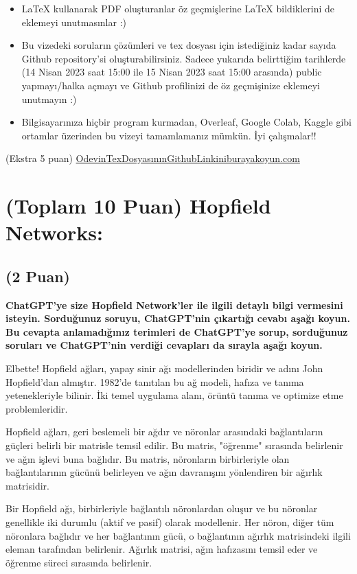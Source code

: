 \documentclass[11pt]{article}
\begin{document}
\begin{itemize}
    \item LaTeX kullanarak PDF oluşturanlar öz geçmişlerine LaTeX bildiklerini de eklemeyi unutmasınlar :)
    \item Bu vizedeki soruların çözümleri ve tex dosyası için istediğiniz kadar sayıda Github repository'si oluşturabilirsiniz. Sadece yukarıda belirttiğim tarihlerde (14 Nisan 2023 saat 15:00 ile 15 Nisan 2023 saat 15:00 arasında) public yapmayı/halka açmayı ve Github profilinizi de öz geçmişinize eklemeyi unutmayın :)
    \item Bilgisayarınıza hiçbir program kurmadan, Overleaf, Google Colab, Kaggle gibi ortamlar üzerinden bu vizeyi tamamlamanız mümkün. İyi çalışmalar!!
\end{itemize}

(Ekstra 5 puan) \url{OdevinTexDosyasınınGithubLinkiniburayakoyun.com}

\newpage
\section{(Toplam 10 Puan) Hopfield Networks:}

\subsection{(2 Puan)} \textbf{ChatGPT’ye size Hopfield Network’ler ile ilgili detaylı bilgi vermesini isteyin. Sorduğunuz soruyu, ChatGPT'nin çıkartığı cevabı aşağı koyun. Bu cevapta anlamadığınız terimleri de ChatGPT’ye sorup, sorduğunuz soruları ve ChatGPT’nin verdiği cevapları da sırayla aşağı koyun.}


Elbette! Hopfield ağları, yapay sinir ağı modellerinden biridir ve adını John Hopfield'dan almıştır. 1982'de tanıtılan bu ağ modeli, hafıza ve tanıma yetenekleriyle bilinir. İki temel uygulama alanı, örüntü tanıma ve optimize etme problemleridir.

Hopfield ağları, geri beslemeli bir ağdır ve nöronlar arasındaki bağlantıların güçleri belirli bir matrisle temsil edilir. Bu matris, "öğrenme" sırasında belirlenir ve ağın işlevi buna bağlıdır. Bu matris, nöronların birbirleriyle olan bağlantılarının gücünü belirleyen ve ağın davranışını yönlendiren bir ağırlık matrisidir.

Bir Hopfield ağı, birbirleriyle bağlantılı nöronlardan oluşur ve bu nöronlar genellikle iki durumlu (aktif ve pasif) olarak modellenir. Her nöron, diğer tüm nöronlara bağlıdır ve her bağlantının gücü, o bağlantının ağırlık matrisindeki ilgili eleman tarafından belirlenir. Ağırlık matrisi, ağın hafızasını temsil eder ve öğrenme süreci sırasında belirlenir.
\end{document}
